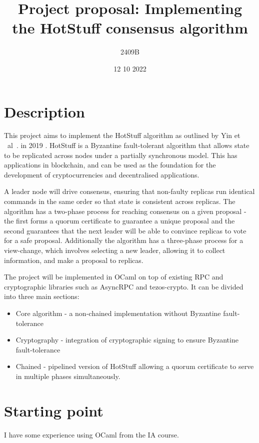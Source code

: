 \documentclass[../main]{subfiles}
\begin{document}
\title{
{Project proposal: Implementing the HotStuff consensus algorithm}
}
\author{2409B}
\date{12 10 2022}
\frenchspacing

\maketitle

\section*{Description}
This project aims to implement the HotStuff algorithm as outlined by Yin et ~al~. in 2019 \cite{yinHotStuffBFTConsensus2019}. HotStuff is a Byzantine fault-tolerant algorithm that allows state to be replicated across nodes under a partially synchronous model. This has applications in blockchain, and can be used as the foundation for the development of cryptocurrencies and decentralised applications.

A leader node will drive consensus, ensuring that non-faulty replicas run identical commands in the same order so that state is consistent across replicas. The algorithm has a two-phase process for reaching consensus on a given proposal - the first forms a quorum certificate to guarantee a unique proposal and the second guarantees that the next leader will be able to convince replicas to vote for a safe proposal. Additionally the algorithm has a three-phase process for a view-change, which involves selecting a new leader, allowing it to collect information, and make a proposal to replicas.

The project will be implemented in OCaml on top of existing RPC and cryptographic libraries such as AsyncRPC and tezos-crypto. It can be divided into three main sections:
\begin{itemize}
	\item Core algorithm - a non-chained implementation without Byzantine fault-tolerance
	\item Cryptography - integration of cryptographic signing to ensure Byzantine fault-tolerance
	\item Chained - pipelined version of HotStuff allowing a quorum certificate to serve in multiple phases simultaneously.
\end{itemize}

\section*{Starting point}
I have some experience using OCaml from the IA course.
\end{document}
